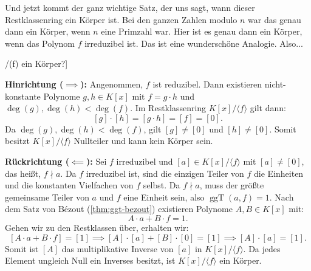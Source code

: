 \begin{spoken-clean}[00:53:37 - 00:57:19]
Und jetzt kommt der ganz wichtige Satz, der uns sagt, wann dieser Restklassenring ein Körper ist. Bei den ganzen Zahlen modulo $n$ war das genau dann ein Körper, wenn $n$ eine Primzahl war. Hier ist es genau dann ein Körper, wenn das Polynom $f$ irreduzibel ist. Das ist eine wunderschöne Analogie. Also...
\end{spoken-clean}

\begin{math-stroke}[Wann ist K[x]/(f) ein Körper?]

\begin{short-proof}
\textbf{Hinrichtung ($\implies$):} Angenommen, $f$ ist reduzibel. Dann existieren nicht-konstante Polynome $g, h \in K[x]$ mit $f = g \cdot h$ und $\deg(g), \deg(h) < \deg(f)$.
Im Restklassenring $K[x]/\langle f \rangle$ gilt dann:
\[
[g] \cdot [h] = [g \cdot h] = [f] = [0].
\]
Da $\deg(g), \deg(h) < \deg(f)$, gilt $[g] \neq [0]$ und $[h] \neq [0]$. Somit besitzt $K[x]/\langle f \rangle$ Nullteiler und kann kein Körper sein.

\textbf{Rückrichtung ($\impliedby$):} Sei $f$ irreduzibel und $[a] \in K[x]/\langle f \rangle$ mit $[a] \neq [0]$, das heißt, $f \nmid a$.
Da $f$ irreduzibel ist, sind die einzigen Teiler von $f$ die Einheiten und die konstanten Vielfachen von $f$ selbst. Da $f \nmid a$, muss der größte gemeinsame Teiler von $a$ und $f$ eine Einheit sein, also $\operatorname{ggT}(a, f) = 1$.
Nach dem Satz von Bézout (\cref{thm:ggt-bezout}) existieren Polynome $A, B \in K[x]$ mit:
\[
A \cdot a + B \cdot f = 1.
\]
Gehen wir zu den Restklassen über, erhalten wir:
\[
[A \cdot a + B \cdot f] = [1] \implies [A] \cdot [a] + [B] \cdot [0] = [1] \implies [A] \cdot [a] = [1].
\]
Somit ist $[A]$ das multiplikative Inverse von $[a]$ in $K[x]/\langle f \rangle$. Da jedes Element ungleich Null ein Inverses besitzt, ist $K[x]/\langle f \rangle$ ein Körper.
\end{short-proof}
\end{math-stroke}

\begin{ai-global-state-checkpoint-invisible-content}
\end{ai-global-state-checkpoint-invisible-content}

